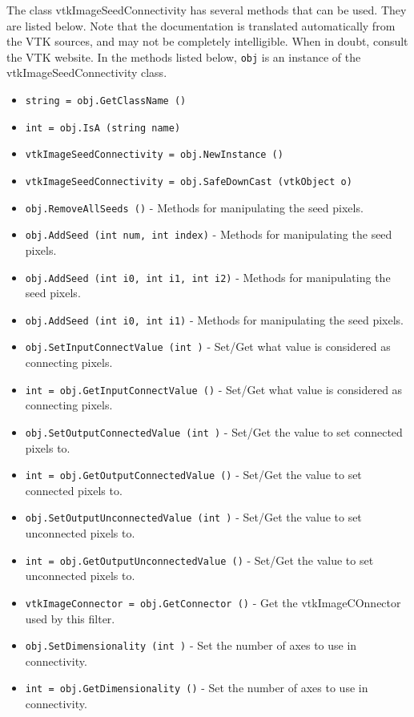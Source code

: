 The class vtkImageSeedConnectivity has several methods that can be used.
  They are listed below.
Note that the documentation is translated automatically from the VTK sources,
and may not be completely intelligible.  When in doubt, consult the VTK website.
In the methods listed below, \verb|obj| is an instance of the vtkImageSeedConnectivity class.
\begin{itemize}
\item  \verb|string = obj.GetClassName ()|

\item  \verb|int = obj.IsA (string name)|

\item  \verb|vtkImageSeedConnectivity = obj.NewInstance ()|

\item  \verb|vtkImageSeedConnectivity = obj.SafeDownCast (vtkObject o)|

\item  \verb|obj.RemoveAllSeeds ()| -  Methods for manipulating the seed pixels.

\item  \verb|obj.AddSeed (int num, int index)| -  Methods for manipulating the seed pixels.

\item  \verb|obj.AddSeed (int i0, int i1, int i2)| -  Methods for manipulating the seed pixels.

\item  \verb|obj.AddSeed (int i0, int i1)| -  Methods for manipulating the seed pixels.

\item  \verb|obj.SetInputConnectValue (int )| -  Set/Get what value is considered as connecting pixels.

\item  \verb|int = obj.GetInputConnectValue ()| -  Set/Get what value is considered as connecting pixels.

\item  \verb|obj.SetOutputConnectedValue (int )| -  Set/Get the value to set connected pixels to.

\item  \verb|int = obj.GetOutputConnectedValue ()| -  Set/Get the value to set connected pixels to.

\item  \verb|obj.SetOutputUnconnectedValue (int )| -  Set/Get the value to set unconnected pixels to.

\item  \verb|int = obj.GetOutputUnconnectedValue ()| -  Set/Get the value to set unconnected pixels to.

\item  \verb|vtkImageConnector = obj.GetConnector ()| -  Get the vtkImageCOnnector used by this filter.

\item  \verb|obj.SetDimensionality (int )| -  Set the number of axes to use in connectivity.

\item  \verb|int = obj.GetDimensionality ()| -  Set the number of axes to use in connectivity.

\end{itemize}
